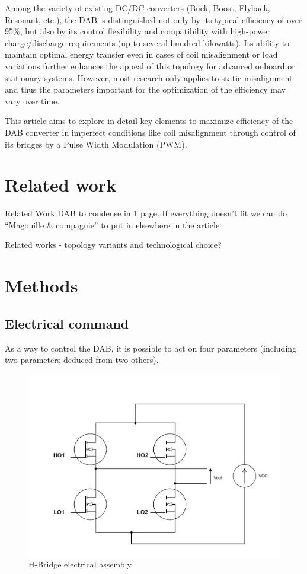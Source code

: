 \documentclass[conference]{IEEEtran}
\begin{document}
Among the variety of existing DC/DC converters (Buck, Boost, Flyback, Resonant, etc.), the DAB is distinguished not only by its typical efficiency of over 95\%, but also by its control flexibility and compatibility with high-power charge/discharge requirements (up to several hundred kilowatts). Its ability to maintain optimal energy transfer even in cases of coil misalignment or load variations further enhances the appeal of this topology for advanced onboard or stationary systems. However, most research only applies to static misalignment and thus the parameters important for the optimization of the efficiency may vary over time.  

This article aims to explore in detail key elements to maximize efficiency of the DAB converter in imperfect conditions like coil misalignment through control of its bridges by a Pulse Width Modulation (PWM). 

\section{Related work}
Related Work DAB to condense in 1 page. If everything doesn’t fit we can do “Magouille \& compagnie” to put in elsewhere in the article

Related works -\> topology variants and technological choice?

\section{Methods}
\subsection{Electrical command}
As a way to control the DAB, it is possible to act on four parameters (including two parameters deduced from two others).  
\begin{figure}[htbp]
	\centerline{\includegraphics[width=\linewidth]{images/1.png}}
	\caption{H-Bridge electrical assembly}
	\label{fig}
\end{figure}
\end{document}
